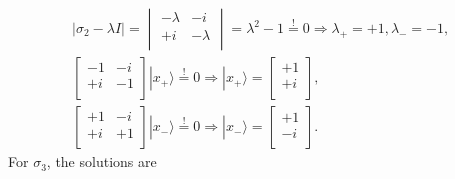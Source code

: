 \documentclass[a4paper,12pt]{article}
\newcommand{\ra}{\rangle}
\begin{document}
    \begin{gather}
        \nonumber
        | \sigma_2 - \lambda I | =
        \begin{vmatrix}
            -\lambda & -i \\
            +i & -\lambda \\
        \end{vmatrix} = \lambda^2 - 1 \overset{!}{=} 0 \Rightarrow \lambda_+ = +1, \lambda_- = -1 \textrm{,} \\
        \nonumber
        \begin{bmatrix}
            -1 & -i \\
            +i & -1 \\
        \end{bmatrix} | x_+ \ra \overset{!}{=} 0 \Rightarrow | x_+ \ra =
        \begin{bmatrix}
            +1 \\
            +i \\
        \end{bmatrix} \textrm{,} \\
        \begin{bmatrix}
            +1 & -i \\
            +i & +1 \\
        \end{bmatrix} | x_- \ra \overset{!}{=} 0 \Rightarrow | x_- \ra =
        \begin{bmatrix}
            +1 \\
            -i \\
        \end{bmatrix} \textrm{.}
    \end{gather}
    For $\sigma_3$, the solutions are
\end{document}
